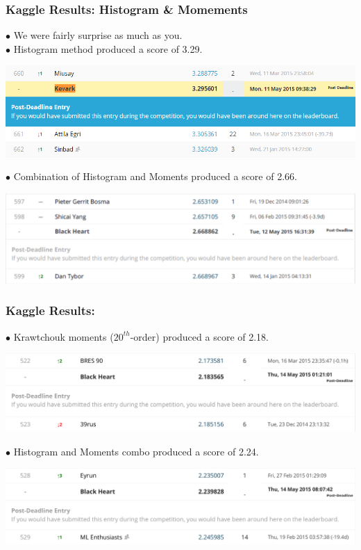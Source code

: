 \documentclass{beamer}
\begin{document}
\begin{frame}
	\frametitle{Kaggle Results: Histogram \& Momements}
$\bullet$ We were fairly surprise as much as you.\\
$\bullet$ Histogram method produced a score of 3.29. \\
\begin{center}
	\includegraphics[scale=0.3]{submission.png}
\end{center}
$\bullet$ Combination of Histogram and Moments produced a score of 2.66. \\
\begin{center}
	\includegraphics[scale=0.25]{combined.png}
\end{center}
\end{frame}


\begin{frame}
	\frametitle{Kaggle Results:}
$\bullet$ Krawtchouk moments ($20^{th}$-order) produced a score of 2.18. \\
\begin{center}
	\includegraphics[scale=0.2]{Telly.png}
\end{center}
$\bullet$ Histogram and Moments combo produced a score of 2.24. \\
\begin{center}
	\includegraphics[scale=0.23]{Kolchak.png}
\end{center}
\end{frame}
\end{document}

